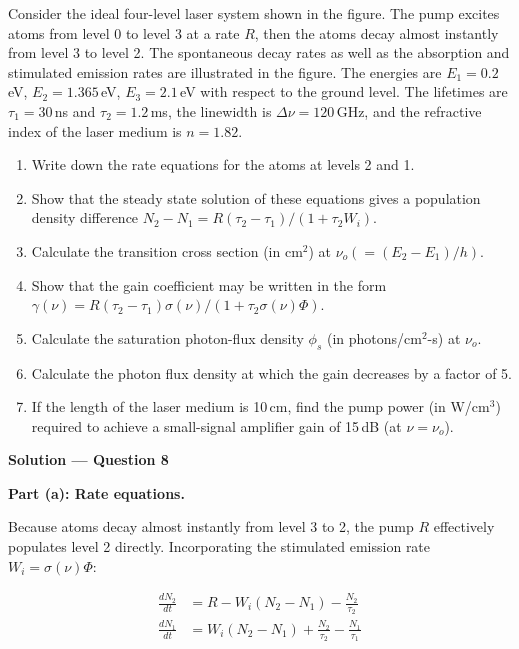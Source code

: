 \begin{question}[Question 8]Consider the ideal four-level laser system shown in the figure. The pump
excites atoms from level 0 to level 3 at a rate $R$, then the atoms decay almost instantly from
level 3 to level 2. The spontaneous decay rates as well as the absorption and stimulated emission
rates are illustrated in the figure. The energies are $E_{1}=0.2$\,eV, $E_{2}=1.365$\,eV,
$E_{3}=2.1$\,eV with respect to the ground level. The lifetimes are $\tau_{1}=30$\,ns and
$\tau_{2}=1.2$\,ms, the linewidth is $\Delta\nu=120$\,GHz, and the refractive index of the
laser medium is $n=1.82$.

\begin{enumerate}[label=(\alph*)]
  \item Write down the rate equations for the atoms at levels 2 and 1.
  \item Show that the steady state solution of these equations gives a population density
        difference $N_{2}-N_{1}=R(\tau_{2}-\tau_{1})/(1+\tau_{2}W_{i})$.
  \item Calculate the transition cross section (in cm$^{2}$) at
        $\nu_{o}(=(E_{2}-E_{1})/h)$.
  \item Show that the gain coefficient may be written in the form
        $\gamma(\nu)=R(\tau_{2}-\tau_{1})\sigma(\nu)/(1+\tau_{2}\sigma(\nu)\Phi)$.
  \item Calculate the saturation photon-flux density $\phi_{s}$ (in photons/cm$^{2}$-s) at
        $\nu_{o}$.
  \item Calculate the photon flux density at which the gain decreases by a factor of 5.
  \item If the length of the laser medium is 10\,cm, find the pump power (in W/cm$^{3}$)
        required to achieve a small-signal amplifier gain of 15\,dB (at $\nu=\nu_{o}$).
\end{enumerate}
\end{question}

\textbf{\large Solution --- Question 8}

\textbf{Part (a): Rate equations.}

Because atoms decay almost instantly from level 3 to 2, the pump $R$ effectively populates level 2 directly. Incorporating the stimulated emission rate $W_i = \sigma(\nu)\Phi$:

\begin{align*}
  \frac{dN_2}{dt} &= R - W_i(N_2 - N_1) - \frac{N_2}{\tau_2} \\[1ex]
  \frac{dN_1}{dt} &= W_i(N_2 - N_1) + \frac{N_2}{\tau_2} - \frac{N_1}{\tau_1}
\end{align*}

